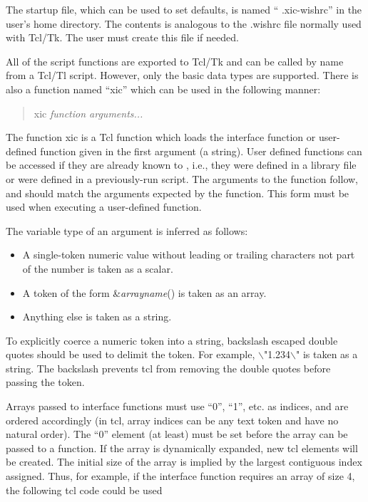 \begin{itemize}
The startup file, which can be used to set defaults, is named ``{\vt
.xic-wishrc}'' in the user's home directory.  The contents is
analogous to the {\vt .wishrc} file normally used with Tcl/Tk.  The
user must create this file if needed.

All of the {\Xic} script functions are exported to Tcl/Tk and can be
called by name from a Tcl/Tl script.  However, only the basic data
types are supported.  There is also a function named ``{\vt xic}''
which can be used in the following manner:
\begin{quote}
{\vt xic} {\it function arguments...}
\end{quote}

The function {\vt xic} is a Tcl function which loads the interface
function or user-defined function given in the first argument (a
string).  User defined functions can be accessed if they are already
known to {\Xic}, i.e., they were defined in a library file or were
defined in a previously-run {\Xic} script.  The arguments to the
function follow, and should match the arguments expected by the
function.  This form must be used when executing a user-defined
function.

The variable type of an argument is inferred as follows:
\begin{itemize}
\item{A single-token numeric value without leading or trailing
characters not part of the number is taken as a scalar.}
\item{A token of the form \&{\it arrayname}() is taken as an array.}
\item{Anything else is taken as a string.}
\end{itemize}

To explicitly coerce a numeric token into a string, backslash escaped
double quotes should be used to delimit the token.  For example, {\vt
$\backslash$"1.234$\backslash$"} is taken as a string.  The backslash
prevents {\et tcl} from removing the double quotes before passing the
token.

Arrays passed to interface functions must use ``0'', ``1'', etc.  as
indices, and are ordered accordingly (in {\et tcl}, array indices can
be any text token and have no natural order).  The ``0'' element (at
least) must be set before the array can be passed to a function.  If
the array is dynamically expanded, new {\et tcl} elements will be
created.  The initial size of the array is implied by the largest
contiguous index assigned.  Thus, for example, if the interface
function requires an array of size 4, the following {\et tcl} code
could be used


\end{itemize}
